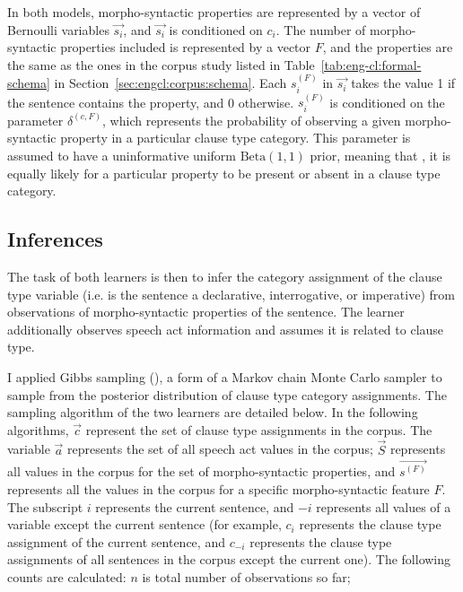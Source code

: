 In both models, morpho-syntactic properties are represented by a vector of Bernoulli variables $\vec{s_{i}}$, and $\vec{s_{i}}$ is conditioned on $c_{i}$. 
The number of morpho-syntactic properties included is represented by a vector $F$, and the properties are the same as the ones in the corpus study listed in Table~\ref{tab:eng-cl:formal-schema} in Section~\ref{sec:engcl:corpus:schema}. Each $s^{(F)}_{i}$ in $\vec{s_{i}}$ takes the value 1 if the sentence contains the property, and 0 otherwise. $s^{(F)}_{i}$ is conditioned on the parameter $\delta^{(c, F)}$, which represents the probability of observing a given morpho-syntactic property in a particular clause type category. 
This parameter is assumed to have a uninformative uniform $\mbox{Beta}(1,1)$ prior, meaning that , it is equally likely for a particular property to be present or absent in a clause type category. 



\subsection{Inferences}
\label{sec:engcl:model:infer}

The task of both learners is then to infer the category assignment of the clause type variable (i.e. is the sentence a declarative, interrogative, or imperative) from observations of morpho-syntactic properties of the sentence. The \plearnerabbr{} learner additionally observes speech act information and assumes it is related to clause type. 

I applied Gibbs sampling (\cite{geman1984gibbs}), a form of a Markov chain Monte Carlo sampler to sample from the posterior distribution of clause type category assignments. The sampling algorithm of the two learners are detailed below. In the following algorithms, $\vec{c}$ represent the set of clause type assignments in the corpus. The variable $\vec{a}$ represents the set of all speech act values in the corpus; $\vec{S}$ represents all values in the corpus for the set of morpho-syntactic properties, and $\vec{s^{(F)}}$ represents all the values in the corpus for a specific morpho-syntactic feature $F$. The subscript $i$ represents the current sentence, and $-i$ represents all values of a variable except the current sentence (for example, $c_{i}$ represents the clause type assignment of the current sentence, and $c_{-i}$ represents the clause type assignments of all sentences in the corpus except the current one). The following counts are calculated:
\bex{}
$n$ is total number of observations so far;

